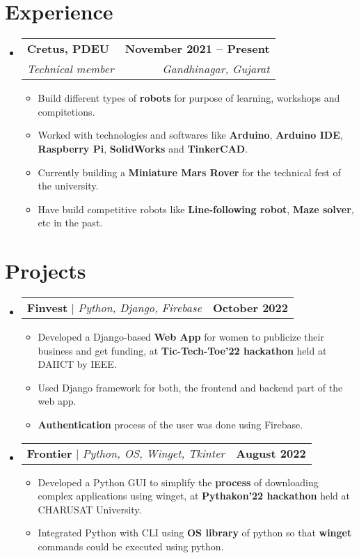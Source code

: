 \documentclass[letterpaper,11pt]{article}
\makeatletter
\newcommand{\resumeItem}[1]{
  \item\small{
    {#1 \vspace{-2pt}}
  }
}
\newcommand{\resumeSubheading}[4]{
  \vspace{-2pt}\item
    \begin{tabular*}{1.0\textwidth}[t]{l@{\extracolsep{\fill}}r}
      \textbf{#1} & \textbf{\small #2} \\
      \textit{\small#3} & \textit{\small #4} \\
    \end{tabular*}\vspace{-7pt}
}
\newcommand{\resumeProjectHeading}[2]{
    \item
    \begin{tabular*}{1.001\textwidth}{l@{\extracolsep{\fill}}r}
      \small#1 & \textbf{\small #2}\\
    \end{tabular*}\vspace{-7pt}
}
\newcommand{\resumeSubHeadingListStart}{\begin{itemize}[leftmargin=0.0in, label={}]}
\newcommand{\resumeSubHeadingListEnd}{\end{itemize}}
\newcommand{\resumeItemListStart}{\begin{itemize}}
\newcommand{\resumeItemListEnd}{\end{itemize}\vspace{-5pt}}
\makeatother
\begin{document}
\section{Experience}
  \resumeSubHeadingListStart
    
    \resumeSubheading
      {Cretus, PDEU}{November 2021 -- Present}
      {Technical member}{Gandhinagar, Gujarat}
      \resumeItemListStart
        \resumeItem{Build different types of \textbf{robots} for purpose of learning, workshops and compitetions. }
        \resumeItem{Worked with technologies and softwares like \textbf{Arduino}, \textbf{Arduino IDE}, \textbf{Raspberry Pi}, \textbf{SolidWorks} and \textbf{TinkerCAD}. }
        \resumeItem{Currently building a \textbf{Miniature Mars Rover} for the technical fest of the university.}
        \resumeItem{Have build competitive robots like \textbf{Line-following robot}, \textbf{Maze solver}, etc in the past.}
    \resumeItemListEnd
    
  \resumeSubHeadingListEnd
\vspace{-16pt}

\section{Projects}
    \vspace{-5pt}
    \resumeSubHeadingListStart
      \resumeProjectHeading
          {\textbf{Finvest} $|$ \emph{Python, Django, Firebase}}{October 2022}
          \resumeItemListStart
            \resumeItem{Developed a Django-based \textbf{Web App} for women to publicize their business and get funding, at \textbf{Tic-Tech-Toe'22 hackathon}  held at DAIICT by IEEE.}
            \resumeItem{Used Django framework for both, the frontend and backend part of the web app. }
            \resumeItem{\textbf{Authentication} process of the user was done using Firebase. }
            \resumeItemListEnd
          \vspace{-13pt}
      \resumeProjectHeading
          {\textbf{Frontier} $|$ \emph{Python, OS, Winget, Tkinter}}{August 2022}
          \resumeItemListStart
            \resumeItem{Developed a Python GUI to simplify the \textbf{process} of downloading complex applications using winget, at \textbf{Pythakon'22 hackathon} held at CHARUSAT University. }
            \resumeItem{Integrated Python with CLI using \textbf{OS library} of python so that \textbf{winget} commands could be executed using python. }
          \resumeItemListEnd 
          \vspace{-13pt}
      
    \resumeSubHeadingListEnd
\vspace{-15pt}
\end{document}
